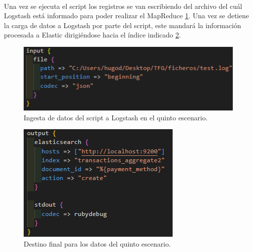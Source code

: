 \paragraph{}
\paragraph{}

Una vez se ejecuta el script los registros se van escribiendo del archivo del cuál Logstash está informado para poder realizar el MapReduce \ref{fig:ingesta52}. Una vez se detiene la carga de datos a Logstash por parte del script, este mandará la información procesada a Elastic dirigiéndose hacia el índice indicado \ref{fig:ingesta53}.

\begin{figure}
    \centering
    \includegraphics[width=1\linewidth]{img/ingesta52.png}
    \caption{Ingesta de datos del script a Logstash en el quinto escenario.}
    \label{fig:ingesta52}
\end{figure}

\begin{figure}
    \centering
    \includegraphics[width=1\linewidth]{img/ingesta53.png}
    \caption{Destino final para los datos del quinto escenario.}
    \label{fig:ingesta53}
\end{figure}

